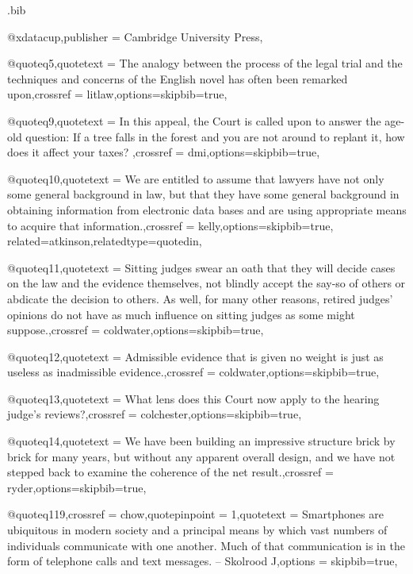 \begin{filecontents*}[overwrite]{\jobname.bib}


@xdata{cup,publisher =  {Cambridge University Press},}

@quote{q5,quotetext =  {The analogy between the process of the legal trial and the techniques and concerns of the English novel has often been remarked upon},crossref =  {litlaw},options={skipbib=true},}

@quote{q9,quotetext =  { In this appeal, the Court is called upon to answer the age-old question:  If a tree falls in the forest and you are not around to replant it, how does it affect your taxes? },crossref =  {dmi},options={skipbib=true},}

@quote{q10,quotetext =  {We are entitled to assume that lawyers have not only some general background in law, but that they have some general background in obtaining information from electronic data bases and are using appropriate means to acquire that information.},crossref =  {kelly},options={skipbib=true}, related={atkinson},relatedtype={quotedin},}

@quote{q11,quotetext =  {Sitting judges swear an oath that they will decide cases on the law and the evidence themselves, not blindly accept the say-so of others or abdicate the decision to others. As well, for many other reasons, retired judges’ opinions do not have as much influence on sitting judges as some might suppose.},crossref =  {coldwater},options={skipbib=true},}

@quote{q12,quotetext =  {Admissible evidence that is given no weight is just as useless as inadmissible evidence.},crossref =  {coldwater},options={skipbib=true},}

@quote{q13,quotetext =  {What lens does this Court now apply to the hearing judge’s reviews?},crossref =  {colchester},options={skipbib=true},}

@quote{q14,quotetext =  {We have been building an impressive structure brick by brick for many years, but without any apparent overall design, and we have not stepped back to examine the coherence of the net result.},crossref =  {ryder},options={skipbib=true},}

@quote{q119,crossref = {chow},quotepinpoint = {1},quotetext = {Smartphones are ubiquitous in modern society and a principal means by which vast numbers of individuals communicate with one another. Much of that communication is in the form of telephone calls and text messages. – Skolrood J},options = {skipbib=true},
}



\end{filecontents*}
